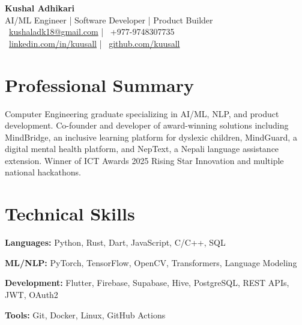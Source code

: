 \documentclass[11pt,a4paper]{article}
\begin{document}
\begin{center}
    {\LARGE \textbf{Kushal Adhikari}} \\[4pt]
    AI/ML Engineer | Software Developer | Product Builder \\[6pt]

    \faEnvelope\ \href{mailto:kushaladk18@gmail.com}{kushaladk18@gmail.com}
    \hspace{0.4cm} | \hspace{0.4cm}
    \faPhone\ +977-9748307735 \\[4pt]

    \faLinkedin\ \href{https://www.linkedin.com/in/kuusall/}{linkedin.com/in/kuusall}
    \hspace{0.4cm} | \hspace{0.4cm}
    \faGithub\ \href{https://github.com/kuusall}{github.com/kuusall}
\end{center}

\section*{Professional Summary}

Computer Engineering graduate specializing in AI/ML, NLP, and product development. Co-founder and developer of award-winning solutions including MindBridge, an inclusive learning platform for dyslexic children, MindGuard, a digital mental health platform, and NepText, a Nepali language assistance extension. Winner of ICT Awards 2025 Rising Star Innovation and multiple national hackathons.
\section*{Technical Skills}

\textbf{Languages:} Python, Rust, Dart, JavaScript, C/C++, SQL

\textbf{ML/NLP:} PyTorch, TensorFlow, OpenCV, Transformers, Language Modeling

\textbf{Development:} Flutter, Firebase, Supabase, Hive, PostgreSQL, REST APIs, JWT, OAuth2

\textbf{Tools:} Git, Docker, Linux, GitHub Actions
\end{document}
